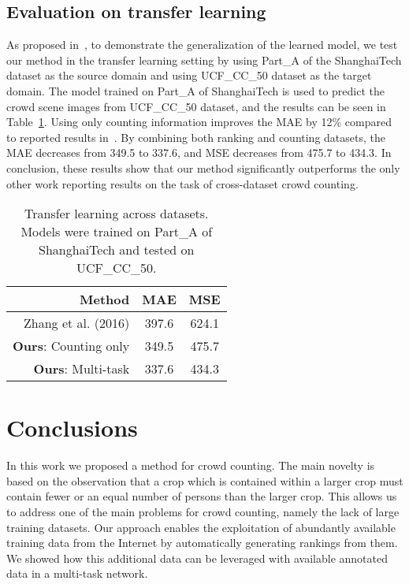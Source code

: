 \documentclass[10pt,twocolumn,letterpaper]{article}
\begin{document}
\subsection{Evaluation on transfer learning}

As proposed in~\cite{zhang2016single}, to demonstrate the
generalization of the learned model, we test our method in the
transfer learning setting by using Part\_A of the ShanghaiTech dataset
as the source domain and using UCF\_CC\_50 dataset as the target
domain. The model trained on Part\_A of ShanghaiTech is used to
predict the crowd scene images from UCF\_CC\_50 dataset, and the
results can be seen in Table~\ref{table:transfer}. Using only counting
information improves the MAE by 12\% compared to reported results
in~\cite{zhang2016single}. By combining both ranking and counting
datasets, the MAE decreases from 349.5 to 337.6, and MSE decreases
from 475.7 to 434.3. In conclusion, these results show that our method
significantly outperforms the only other work reporting results
on the task of cross-dataset crowd counting.

\begin{table}[tb]
\centering

\begin{tabular}{rcc}
\hline
\textbf{Method} & \textbf{MAE}   & \textbf{MSE}   \\ \hline \hline
Zhang et al. (2016) \cite{zhang2016single}      & 397.6 & 624.1 \\ \hline
\textbf{Ours}: Counting only        & 349.5 & 475.7 \\
\textbf{Ours}: Multi-task   & 337.6 & 434.3 \\ \hline
\end{tabular}
\caption{Transfer learning across datasets. Models were trained on
  Part\_A of ShanghaiTech and tested on UCF\_CC\_50.}
\label{table:transfer}
\end{table}

\section{Conclusions}
In this work we proposed a method for crowd counting. The main novelty
is based on the observation that a crop which is contained within a
larger crop must contain fewer or an equal number of persons than the
larger crop. This allows us to address one of the main problems for
crowd counting, namely the lack of large training datasets. Our
approach enables the exploitation of abundantly available training
data from the Internet by automatically generating rankings from
them. We showed how this additional data can be leveraged with
available annotated data in a multi-task network. 
\end{document}
